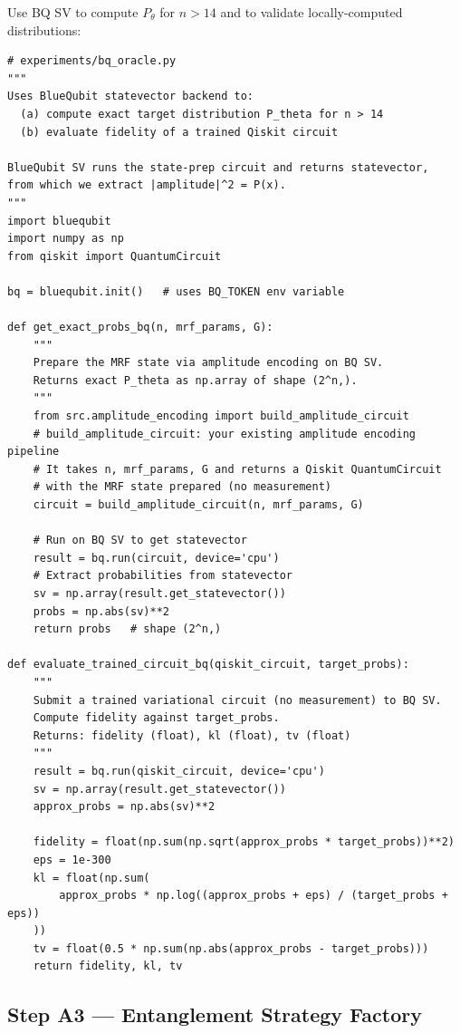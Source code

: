 \documentclass[11pt]{article}
\begin{document}
Use BQ SV to compute $P_\theta$ for $n > 14$ and to validate
locally-computed distributions:

\begin{lstlisting}
# experiments/bq_oracle.py
"""
Uses BlueQubit statevector backend to:
  (a) compute exact target distribution P_theta for n > 14
  (b) evaluate fidelity of a trained Qiskit circuit

BlueQubit SV runs the state-prep circuit and returns statevector,
from which we extract |amplitude|^2 = P(x).
"""
import bluequbit
import numpy as np
from qiskit import QuantumCircuit

bq = bluequbit.init()   # uses BQ_TOKEN env variable

def get_exact_probs_bq(n, mrf_params, G):
    """
    Prepare the MRF state via amplitude encoding on BQ SV.
    Returns exact P_theta as np.array of shape (2^n,).
    """
    from src.amplitude_encoding import build_amplitude_circuit
    # build_amplitude_circuit: your existing amplitude encoding pipeline
    # It takes n, mrf_params, G and returns a Qiskit QuantumCircuit
    # with the MRF state prepared (no measurement)
    circuit = build_amplitude_circuit(n, mrf_params, G)

    # Run on BQ SV to get statevector
    result = bq.run(circuit, device='cpu')
    # Extract probabilities from statevector
    sv = np.array(result.get_statevector())
    probs = np.abs(sv)**2
    return probs   # shape (2^n,)

def evaluate_trained_circuit_bq(qiskit_circuit, target_probs):
    """
    Submit a trained variational circuit (no measurement) to BQ SV.
    Compute fidelity against target_probs.
    Returns: fidelity (float), kl (float), tv (float)
    """
    result = bq.run(qiskit_circuit, device='cpu')
    sv = np.array(result.get_statevector())
    approx_probs = np.abs(sv)**2

    fidelity = float(np.sum(np.sqrt(approx_probs * target_probs))**2)
    eps = 1e-300
    kl = float(np.sum(
        approx_probs * np.log((approx_probs + eps) / (target_probs + eps))
    ))
    tv = float(0.5 * np.sum(np.abs(approx_probs - target_probs)))
    return fidelity, kl, tv
\end{lstlisting}

\subsection{Step A3 --- Entanglement Strategy Factory}
\end{document}
